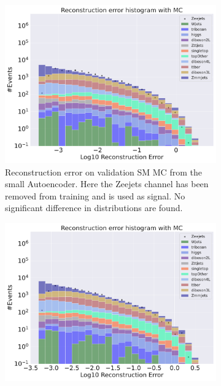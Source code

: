 \begin{figure}[H]
    \centering
    \begin{subfigure}{.45\textwidth}
        \includegraphics[width=\textwidth]{Figures/AE_testing/small/b_data_recon_big_rm3_feats_sig_Zeejets.pdf}
        \caption{Reconstruction error on validation SM MC from the small Autoencoder. Here the Zeejets channel has been removed from training and 
        is used as signal. No significant difference in distributions are found.}
        \label{fig:ae_small_Zeejets}
    \end{subfigure}
    \hfill 
    \begin{subfigure}{.45\textwidth}
        \includegraphics[width=\textwidth]{Figures/AE_testing/big/b_data_recon_big_rm3_feats_sig_Zeejets.pdf}

\end{subfigure}
\end{figure}
